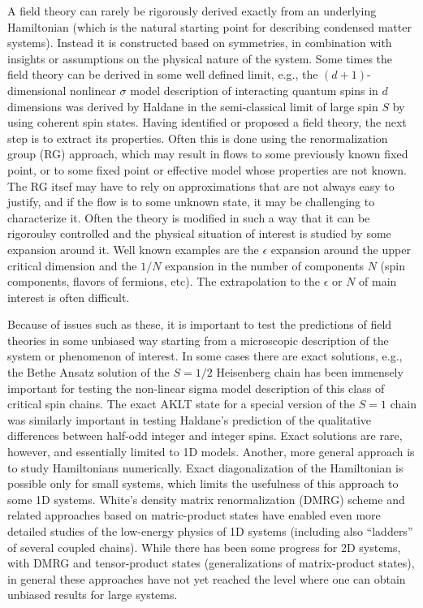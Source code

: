 \documentclass[aps,prb,groupedaddress,twocolumn]{revtex4}
\begin{document}
A field theory can rarely be rigorously derived exactly from 
an underlying Hamiltonian (which is the natural starting point for describing condensed matter systems). Instead
it is constructed based on symmetries, in combination with insights or assumptions on the physical nature of the
system. Some times the field theory can be derived in some well defined limit, e.g., the $(d+1)$-dimensional
nonlinear $\sigma$ model description of interacting quantum spins in $d$ dimensions was derived by Haldane in 
the semi-classical limit of large spin $S$ by using coherent spin states. Having identified or proposed a field
theory, the next step is to extract its properties. Often this is done using the renormalization group (RG)
approach, which may result in flows to some previously known fixed point, or to some fixed point or effective
model whose properties are not known. The RG itsef may have to rely on approximations that are not always easy
to justify, and if the flow is to some unknown state, it may be challenging to characterize it. Often the theory
is modified in such a way that it can be rigoroulsy controlled and the physical situation of interest is studied 
by some expansion around it. Well known examples are the $\epsilon$ expansion around the upper critical dimension 
and the $1/N$ expansion in the number of components $N$ (spin components, flavors of fermions, etc). The
extrapolation to the $\epsilon$ or $N$ of main interest is often difficult.

Because of issues such as these, it is important to test the predictions of field theories in some unbiased way
starting from a microscopic description of the system or phenomenon of interest. In some
cases there are exact solutions, e.g., the Bethe Ansatz solution of the $S=1/2$ Heisenberg chain has been immensely
important for testing the non-linear sigma model description of this class of critical spin chains. The exact
AKLT state for a special version of the $S=1$ chain was similarly important in testing Haldane's prediction of
the qualitative differences between half-odd integer and integer spins. Exact solutions are rare, however, and
essentially limited to 1D models. Another, more general approach is to study Hamiltonians numerically. Exact
diagonalization of the Hamiltonian is possible only for small systems, which limits the usefulness of this approach 
to some 1D systems. White's density matrix renormalization (DMRG) scheme and related approaches based 
on matric-product states have enabled even more detailed studies of the low-energy physics of 1D systems (including
also ``ladders'' of several coupled chains). While there has been some progress for 2D systems, with
DMRG and tensor-product states (generalizations of matrix-product states), in general these approaches have not
yet reached the level where one can obtain unbiased results for large systems.
\end{document}
